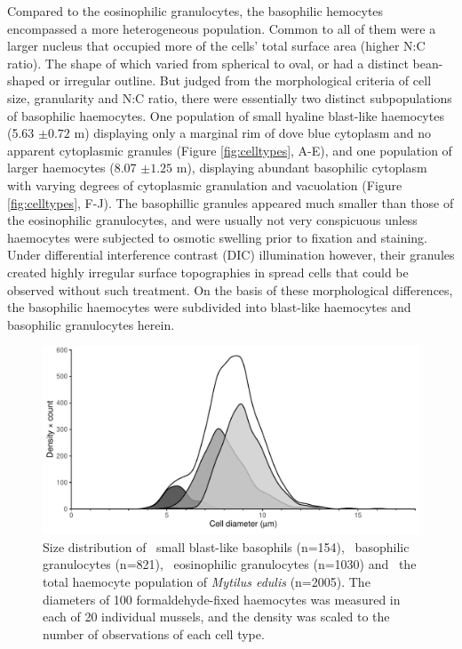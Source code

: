 Compared to the eosinophilic granulocytes, the basophilic hemocytes encompassed a more heterogeneous population. Common to all of them were a larger nucleus that occupied more of the cells' total surface area (higher N:C ratio). The shape of which varied from spherical to oval, or had a distinct bean-shaped or irregular outline. But judged from the morphological criteria of cell size, granularity and N:C ratio, there were essentially two distinct subpopulations of basophilic haemocytes. One population of small hyaline blast-like haemocytes (5.63 $\pm{0.72}$ \micro m) displaying only a marginal rim of dove blue cytoplasm and no apparent cytoplasmic granules (Figure \ref{fig:celltypes}, A-E), and one population of larger haemocytes (8.07 $\pm{1.25}$ \micro m), displaying abundant basophilic cytoplasm with varying degrees of cytoplasmic granulation and vacuolation (Figure \ref{fig:celltypes}, F-J). The basophillic granules appeared much smaller than those of the eosinophilic granulocytes, and were usually not very conspicuous unless haemocytes were subjected to osmotic swelling prior to fixation and staining. Under differential interference contrast (DIC) illumination however, their granules created highly irregular surface topographies in spread cells that could be observed without such treatment. On the basis of these morphological differences, the basophilic haemocytes were subdivided into blast-like haemocytes and basophilic granulocytes herein. 

\begin{figure}[!ht]
    \centering
    \includegraphics[width=1.0\textwidth]{figures/Anatomy/diameters scaled density plot.pdf}
    \caption{Size distribution of \protect\dimgraybox \ small blast-like basophils (n=154), \protect\lightgraybox \ basophilic granulocytes (n=821), \protect\lysegraabox \ eosinophilic granulocytes (n=1030) and \protect\whitebox \ the total haemocyte population of \emph{Mytilus edulis} (n=2005). The diameters of 100 formaldehyde-fixed haemocytes was measured in each of 20 individual mussels, and the density was scaled to the number of observations of each cell type.}
    \label{fig:Diameters}
\end{figure}

